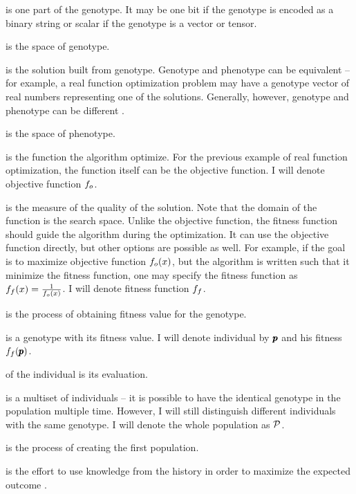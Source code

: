  is one part of the genotype. It may be one bit if the genotype is encoded as a binary string or scalar if the genotype is a vector or tensor. 

 is the space of genotype.

 is the solution built from genotype. Genotype and phenotype can be equivalent -- for example, a real function optimization problem may have a genotype vector of real numbers representing one of the solutions. Generally, however, genotype and phenotype can be different \citep{GeneticAlgorithmEssentials}.

 is the space of phenotype.

 is the function the algorithm optimize. For the previous example of real function optimization, the function itself can be the objective function. I will denote objective function $f_o$.

 is the measure of the quality of the solution. Note that the domain of the function is the search space. Unlike the objective function, the fitness function should guide the algorithm during the optimization. It can use the objective function directly, but other options are possible as well. For example, if the goal is to maximize objective function $f_o(x)$, but the algorithm is written such that it minimize the fitness function, one may specify the fitness function as $f_f(x)=\frac{1}{f_o(x)}$. I will denote fitness function $f_f$.

 is the process of obtaining fitness value for the genotype.

 is a genotype with its fitness value. I will denote individual by $\pmb{p}$ and his fitness $f_f(\pmb{p})$.

 of the individual is its evaluation. 

 is a multiset of individuals -- it is possible to have the identical genotype in the population multiple time. However, I will still distinguish different individuals with the same genotype. I will denote the whole population as $\mathcal{P}$.

 is the process of creating the first population.

 is the effort to use knowledge from the history in order to maximize the expected outcome \citep{SelfAdaptiveFeaturesInRealParameterEvolutionaryAlgorithms}.


